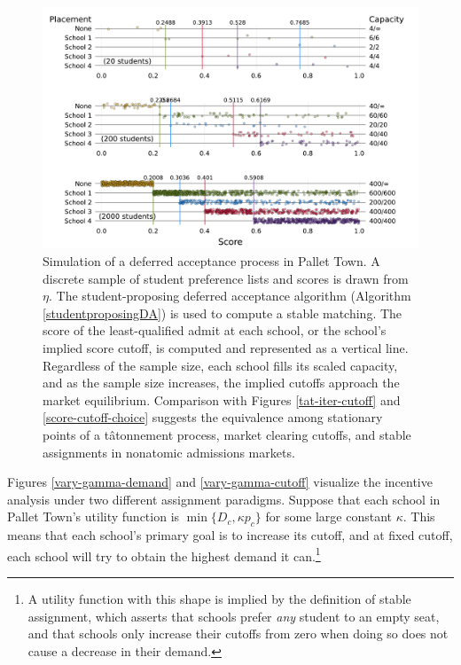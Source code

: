 \documentclass[12pt]{article}
\theoremstyle{definition}
\begin{document}
\begin{figure}
\begin{center}\includegraphics[width=\linewidth, ]{plots/score-DA-placement.pdf}\end{center}
\captionsetup{singlelinecheck=off}
    \caption[.]{Simulation of a deferred acceptance process in Pallet Town. A discrete sample of student preference lists and scores is drawn from $\eta$. The student-proposing deferred acceptance algorithm (Algorithm \ref{studentproposingDA}) is used to compute a stable matching. The score of the least-qualified admit at each school, or the school's implied score cutoff, is computed and represented as a vertical line. Regardless of the sample size, each school fills its scaled capacity, and as the sample size increases, the implied cutoffs approach the market equilibrium. Comparison with Figures \ref{tat-iter-cutoff} and \ref{score-cutoff-choice} suggests the equivalence among stationary points of a t\^{a}tonnement process, market clearing cutoffs, and stable assignments in nonatomic admissions markets.}
\label{score-DA-placement}
\end{figure}




Figures \ref{vary-gamma-demand} and \ref{vary-gamma-cutoff} visualize the incentive analysis under two different assignment paradigms. Suppose that each school in Pallet Town's utility function is $\min \{D_c, \kappa p_c \}$ for some large constant $\kappa$. This means that each school's primary goal is to increase its cutoff, and at fixed cutoff, each school will try to obtain the highest demand it can.\footnote{A utility function with this shape is implied by the definition of stable assignment, which asserts that schools prefer \emph{any} student to an empty seat, and that schools only increase their cutoffs from zero when doing so does not cause a decrease in their demand.}
\end{document}
